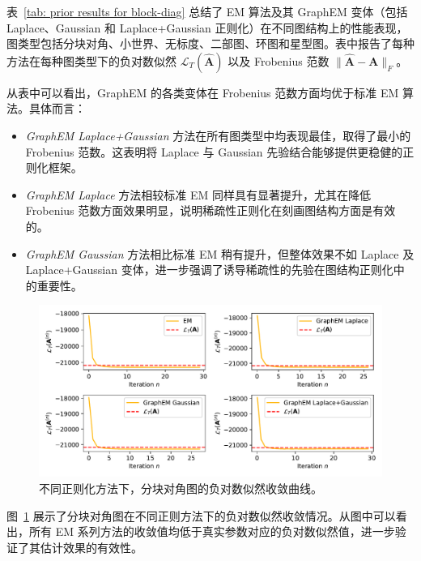 表~\ref{tab: prior results for block-diag} 总结了 EM 算法及其 GraphEM 变体（包括 Laplace、Gaussian 和 Laplace+Gaussian 正则化）在不同图结构上的性能表现，图类型包括分块对角、小世界、无标度、二部图、环图和星型图。表中报告了每种方法在每种图类型下的负对数似然 \(\mathcal{L}_T(\widehat{\mathbf{A}})\) 以及 Frobenius 范数 \(\| \widehat{\mathbf{A}} - \mathbf{A} \|_F\)。

从表中可以看出，GraphEM 的各类变体在 Frobenius 范数方面均优于标准 EM 算法。具体而言：
\begin{itemize}
    \item \textit{GraphEM Laplace+Gaussian} 方法在所有图类型中均表现最佳，取得了最小的 Frobenius 范数。这表明将 Laplace 与 Gaussian 先验结合能够提供更稳健的正则化框架。
    \item \textit{GraphEM Laplace} 方法相较标准 EM 同样具有显著提升，尤其在降低 Frobenius 范数方面效果明显，说明稀疏性正则化在刻画图结构方面是有效的。
    \item \textit{GraphEM Gaussian} 方法相比标准 EM 稍有提升，但整体效果不如 Laplace 及 Laplace+Gaussian 变体，进一步强调了诱导稀疏性的先验在图结构正则化中的重要性。
\end{itemize}

\begin{figure}[tb]
    \centering
    \includegraphics[width=0.85\linewidth]{fig/block diagonal/neg_log_likelihood.pdf}
    \caption{不同正则化方法下，分块对角图的负对数似然收敛曲线。}
    \label{fig: neg log likelihood}
\end{figure}

图~\ref{fig: neg log likelihood} 展示了分块对角图在不同正则方法下的负对数似然收敛情况。从图中可以看出，所有 EM 系列方法的收敛值均低于真实参数对应的负对数似然值，进一步验证了其估计效果的有效性。

